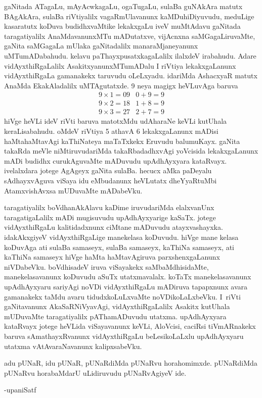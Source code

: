gaNitada ATagaLu, mAyAcwkagaLu, ogaTugaLu, sulaBa guNAkAra matutx BAgAkAra, sulaBa riVtiyalilx vagaRmUlavanunx kaMDuhiDiyuvudu, meduLige kasaratutx koDuva budidhxvaMtike lekakxgaLu iveV muMtAdavu gaNitada taragatiyalilx AnaMdavanunxMTu mADutatxve, vijAcnxna saMGagaLiruvaMte, gaNita saMGagaLa mUlaka gaNitadalilx manaraMjaneyanunx uMTumADabahudu. kelavu paThayxpusatxkagaLalilx ilalxdeV irabahudu. Adare vidAyxthiRgaLalilx AsakitxyanunxMTumADalu I riVtiya lekakxgaLanunx vidAyxthiRgaLa gamanakekx taruvudu oLeLxyadu. idariMda AshacxyaR matutx AnaMda EkakAladalilx uMTAgutatxde. {\rm 9} neya magigx heVLuvAga baruva 
$$
\begin{matrix}
9\times 1=09 & 0+9 = 9\\
9\times 2=18 & 1+8 = 9\\
9\times 3=27 & 2+7 = 9
\end{matrix}
$$ hiVge heVLi ideV riVti baruva matotxMdu udAharaNe keVLi kutUhala keraLisabahudu. oMdeV riVtiya {\rm 5} athavA {\rm 6} lekakxgaLanunx mADisi haMtahaMtavAgi kaThiNateya maTaTxkekx Eruvudu balumuKayx. gaNita takaRda meVle niMtiruvudariMda takaRbadadhxvAgi yoVcisida lekakxgaLanunx mADi budidhx curukAguvaMte mADuvudu upAdhAyxyara kataRvayx. ivelalxdara jotege AgAgeyx gaNita sulaBa. hecucx aMka paDeyalu sAdhayxvAguva viSaya idu eMbudanunx heVLutatx dheYyaRtuMbi AtamxvishAvxsa mUDuvaMte mADabeVku.

taragatiyalilx boVdhanAkAlavu kaDime iruvudariMda elalxvanUnx taragatigaLalilx mADi mugisuvudu upAdhAyxyarige kaSaTx. jotege vidAyxthiRgaLu kalitidadxnunx ciMtane mADuvudu atayxvashayxka. idakAkxgiyeV vidAyxthiRgaLige manekelasa koDuvudu. hiVge mane kelasa koDuvAga ati sulaBa samaseyx, sulaBa samaseyx, kaThiNa samaseyx, ati kaThiNa samaseyx hiVge haMta haMtavAgiruva parxshenxgaLanunx niVDabeVku. boVdhisadeV iruva viSayakekx saMbaMdhisidaMte,
manekelasavanunx koDuvudu aSuTx utatxmavalalx. koTaTx manekelasavanunx upAdhAyxyaru sariyAgi noVDi vidAyxthiRgaLu mADiruva tapapxnunx avara gamanakekx taMdu avaru tidudxkoLuLxvaMte noVDikoLaLxbeVku. I~riVti gaNitavanunx AkaSaRNiVyavAgi, vidAyxthiRgaLalilx Asakitx kutUhala mUDuvaMte taragatiyalilx pAThamADuvudu utatxma. upAdhAyxyara kataRvayx jotege heVLida viSayavanunx keVLi, AloVcisi, caciRsi tiVmARnakekx baruva sAmathayxRvanunx vidAyxthiRgaLu beLesikoLaLxlu upAdhAyxyaru utatxma vAtAvaraNavanunx kalipxsabeVku.

adu pUNaR, idu pUNaR, pUNaRdiMda pUNaRvu horahomimxde. pUNaR\-diMda pUNaRvu horabaMdarU uLidiruvudu pUNaRvAgiyeV ide.

\begin{flushright}
-upaniSatf
\end{flushright}

